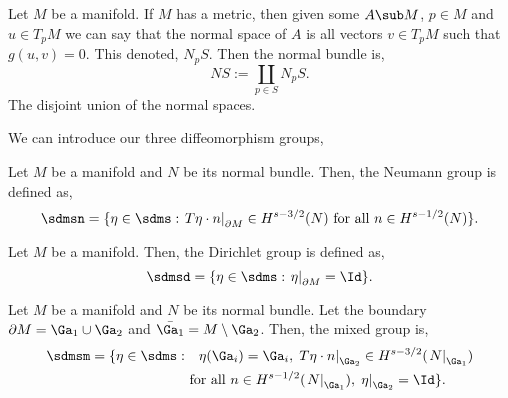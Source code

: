 \begin{ndefi}
  Let $M$ be a manifold. If $M$ has a metric, then given some $A \sub M$, $p \in M$ and $u \in T_pM$ we can say that the normal space of $A$ is all vectors $v \in T_pM$ such that $g(u,v) = 0$. This denoted, $N_pS$. Then the normal bundle is,
  $$ NS := \coprod_{p \in S} N_pS. $$
  The disjoint union of the normal spaces.
\end{ndefi}
\noindent
We can introduce our three diffeomorphism groups,
\begin{ndefi}
  Let $M$ be a manifold and $N$ be its normal bundle. Then, the Neumann group is defined as,
  $$ \sdmsn = \{ \eta \in \sdms : \left.T\eta \cdot n\right|_{\partial M} \in H^{s - 3/2}(N) \text{ for all } n \in H^{s - 1/2}(N) \}. $$
\end{ndefi}
\begin{ndefi}
  Let $M$ be a manifold. Then, the Dirichlet group is defined as,
  $$ \sdmsd = \{ \eta \in \sdms : \left. \eta \right|_{\partial M} = \Id \}. $$
\end{ndefi}
\begin{ndefi}
  Let $M$ be a manifold and $N$ be its normal bundle. Let the boundary $\partial M = \Ga_1 \cup \Ga_2$ and $\bar{\Ga_1} = M \setminus \Ga_2$. Then, the mixed group is,
  \begin{align*}
    \sdmsm = \{ \eta \in \sdms : &\quad\eta (\Ga_i) = \Ga_i,\, \left.T\eta \cdot n\right|_{\Ga_2} \in H^{s - 3/2}(\left. N \right|_{\Ga_1}) \\
    &\text{ for all } n \in H^{s - 1/2}(\left. N \right|_{\Ga_1}),\, \left. \eta \right|_{\Ga_2} = \Id \}.
  \end{align*}
\end{ndefi}

